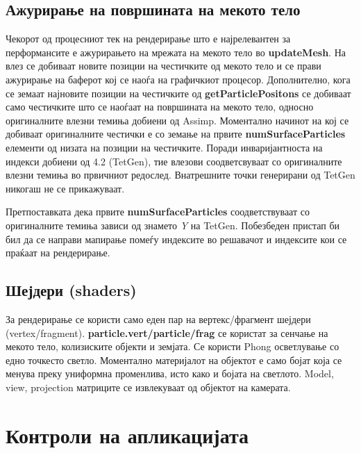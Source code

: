 \subsection{Ажурирање на површината на мекото тело}
Чекорот од процесниот тек на рендерирање што е најрелевантен за перформансите е ажурирањето на мрежата на мекото тело во \textbf{updateMesh}. На влез се добиваат новите позиции на честичките од мекото тело и се прави ажурирање на баферот кој се наоѓа на графичкиот процесор.  Дополнително, кога се земаат најновите позиции на честичките од \textbf{getParticlePositons} се добиваат само честичките што се наоѓаат на површината на мекото тело, односно оригиналните влезни темиња добиени од Assimp.  Моментално начинот на кој се добиваат оригиналните честички е со земање на првите \textbf{numSurfaceParticles} елементи од низата на позиции на честичките. Поради инваријантноста на индекси добиени од 4.2 (TetGen), тие влезови соодветсвуваат со оригиналните влезни темиња во првичниот редослед. Внатрешните точки генерирани од TetGen никогаш не се прикажуваат.

Претпоставката дека првите \textbf{numSurfaceParticles} соодветствуваат со оригиналните темиња зависи од знамето \textit{Y} на TetGen. Побезбеден пристап би бил да се направи мапирање помеѓу индексите во решавачот и индексите кои се праќаат на рендерирање.

\subsection{Шејдери (shaders)}
За рендерирање се користи само еден пар на вертекс/фрагмент шејдери (vertex/fragment). \textbf{particle.vert/particle/frag} се користат за сенчање на мекото тело, колизиските објекти и земјата. Се користи Phong осветлување со едно точкесто светло. Моментално материјалот на објектот е само бојат која се менува преку униформна променлива, исто како и бојата на светлото. Model, view, projection матриците се извлекуваат од објектот на камерата.

\section{Контроли на апликацијата}
